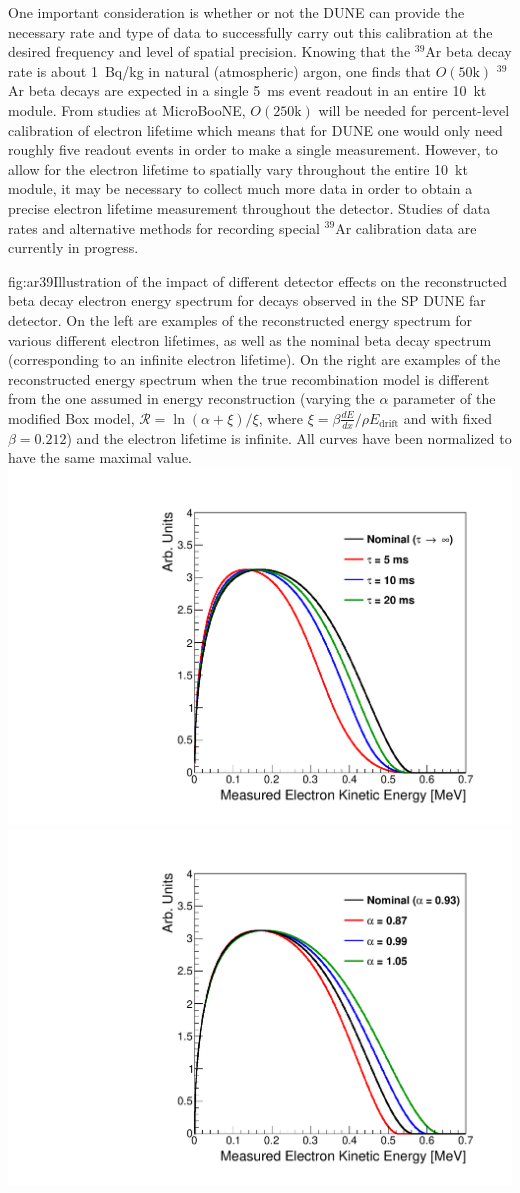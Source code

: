 One important consideration is whether or not the DUNE 
 can provide the necessary rate and type of data 
to successfully carry out this calibration at the desired frequency and level of spatial precision.  Knowing that the $^{39}$Ar beta decay rate is about 1~Bq/kg in natural (atmospheric) argon, one finds that $O(\mathrm{50k})$ $^{39}$Ar beta decays are expected in a single 5~ms event readout in an entire 10~kt module.  
From studies at MicroBooNE, $O(\mathrm{250k})$ will be needed 
for percent-level calibration of electron lifetime which means that for DUNE one would only need roughly five readout events in order to make a single measurement. 
However, to allow for the electron lifetime to spatially vary throughout the entire 10~kt module, it may be necessary to collect much more data in order to obtain a precise electron lifetime measurement throughout the detector.  
Studies of data rates and alternative methods for recording special $^{39}$Ar calibration data are currently in progress.



\begin{dunefigure}{fig:ar39}{Illustration of the impact of different detector effects on the reconstructed  beta decay electron energy spectrum for decays observed in the SP DUNE far detector.  On the left are examples of the reconstructed energy spectrum for various different electron lifetimes, as well as the nominal 
 beta decay spectrum (corresponding to an infinite electron lifetime).  On the right are examples of the reconstructed energy spectrum when the true recombination model is different from the one assumed in energy reconstruction (varying the $\alpha$ parameter of the modified Box model, $\mathcal{R} = \ln(\alpha + \xi)/\xi$, where $\xi = \beta\frac{dE}{dx}/{\rho}E_{\mathrm{drift}}$ and with fixed $\beta = 0.212$) and the electron lifetime is infinite.  All curves have been normalized to have the same maximal value.}
\includegraphics[width=.49\textwidth]{graphics/Ar39_energyPlot_DUNESPFD_lifetime.pdf}
\includegraphics[width=.49\textwidth]{graphics/Ar39_energyPlot_DUNESPFD_recomb.pdf}
\end{dunefigure}